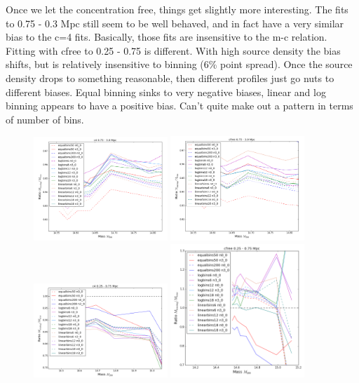 \documentclass[11pt]{article}
\begin{document}
Once we let the concentration free, things get slightly more interesting. The fits to 0.75 - 0.3 Mpc still seem to be well behaved, and in fact have a very similar bias to the c=4 fits. Basically, those fits are insensitive to the m-c relation. Fitting with cfree to 0.25 - 0.75 is different. With high source density the bias shifts, but is relatively insensitive to binning (6\% point spread). Once the source density drops to something reasonable, then different profiles just go nuts to different biases. Equal binning sinks to very negative biases, linear and log binning appears to have a positive bias. Can't quite make out a pattern in terms of number of bins.

\begin{figure}
\centering
\includegraphics[width=0.45\textwidth]{figures/density_binning_wtg}
\includegraphics[width=0.45\textwidth]{figures/density_binning_wtg_cfree} \\
\includegraphics[width=0.45\textwidth]{figures/density_binning_core}
\includegraphics[width=0.45\textwidth]{figures/density_binning_core_cfree}\\

\end{figure}
\end{document}

